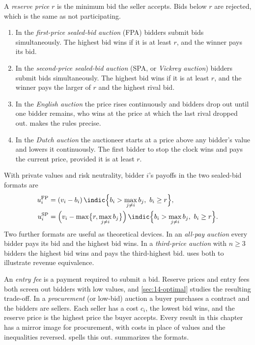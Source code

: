 \begin{definition}\label{def:14-formats}
A \emph{reserve price} $r$ is the minimum bid the seller accepts. Bids below $r$ are rejected, which is the
same as not participating.
\begin{enumerate}[label=(\roman*)]
  \item In the \emph{first-price sealed-bid auction} (FPA) bidders submit bids simultaneously. The highest
  bid wins if it is at least $r$, and the winner pays its bid.
  \item In the \emph{second-price sealed-bid auction} (SPA, or \emph{Vickrey auction}) bidders submit bids
  simultaneously. The highest bid wins if it is at least $r$, and the winner pays the larger of $r$ and the
  highest rival bid.
  \item In the \emph{English auction} the price rises continuously and bidders drop out until one bidder
  remains, who wins at the price at which the last rival dropped out.  makes the rules
  precise.
  \item In the \emph{Dutch auction} the auctioneer starts at a price above any bidder's value and lowers it
  continuously. The first bidder to stop the clock wins and pays the current price, provided it is at
  least $r$.
\end{enumerate}
\end{definition}

With private values and risk neutrality, bidder $i$'s payoffs in the two sealed-bid formats are
\begin{align}
u_i^{\mathrm{FP}} &= (v_i-b_i)\,\indic\Bigl\{b_i>\max_{j\neq i}b_j,\ b_i\ge r\Bigr\}, \label{eq:14-payoff-fpa}\\
u_i^{\mathrm{SP}} &= \Bigl(v_i-\max\bigl\{r,\max_{j\neq i}b_j\bigr\}\Bigr)\,\indic\Bigl\{b_i>\max_{j\neq i}b_j,\ b_i\ge r\Bigr\}.
\label{eq:14-payoff-spa}
\end{align}
Two further formats are useful as theoretical devices. In an \emph{all-pay auction} every bidder pays its
bid and the highest bid wins. In a \emph{third-price auction} with $n\ge 3$ bidders the highest bid wins
and pays the third-highest bid.  uses both to illustrate revenue equivalence.

An \emph{entry fee} is a payment required to submit a bid. Reserve prices and entry fees both screen out
bidders with low values, and \cref{sec:14-optimal} studies the resulting trade-off. In a \emph{procurement}
(or low-bid) auction a buyer purchases a contract and the bidders are sellers. Each seller has a cost $c_i$,
the lowest bid wins, and the reserve price is the highest price the buyer accepts. Every result in this
chapter has a mirror image for procurement, with costs in place of values and the inequalities reversed.
 spells this out.  summarizes the formats.


